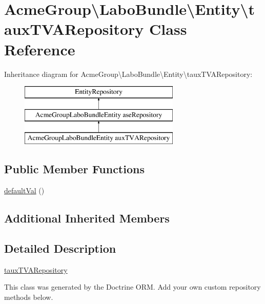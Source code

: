 \hypertarget{class_acme_group_1_1_labo_bundle_1_1_entity_1_1taux_t_v_a_repository}{\section{Acme\+Group\textbackslash{}Labo\+Bundle\textbackslash{}Entity\textbackslash{}taux\+T\+V\+A\+Repository Class Reference}
\label{class_acme_group_1_1_labo_bundle_1_1_entity_1_1taux_t_v_a_repository}
}
Inheritance diagram for Acme\+Group\textbackslash{}Labo\+Bundle\textbackslash{}Entity\textbackslash{}taux\+T\+V\+A\+Repository\+:\begin{figure}[H]
\begin{center}
\leavevmode
\includegraphics[height=3.000000cm]{class_acme_group_1_1_labo_bundle_1_1_entity_1_1taux_t_v_a_repository}
\end{center}
\end{figure}
\subsection*{Public Member Functions}
\begin{DoxyCompactItemize}
\item 
\hyperlink{class_acme_group_1_1_labo_bundle_1_1_entity_1_1taux_t_v_a_repository_a59ee5ae75bc37012d5aae4e3f671e146}{default\+Val} ()
\end{DoxyCompactItemize}
\subsection*{Additional Inherited Members}


\subsection{Detailed Description}
\hyperlink{class_acme_group_1_1_labo_bundle_1_1_entity_1_1taux_t_v_a_repository}{taux\+T\+V\+A\+Repository}

This class was generated by the Doctrine O\+R\+M. Add your own custom repository methods below. 

